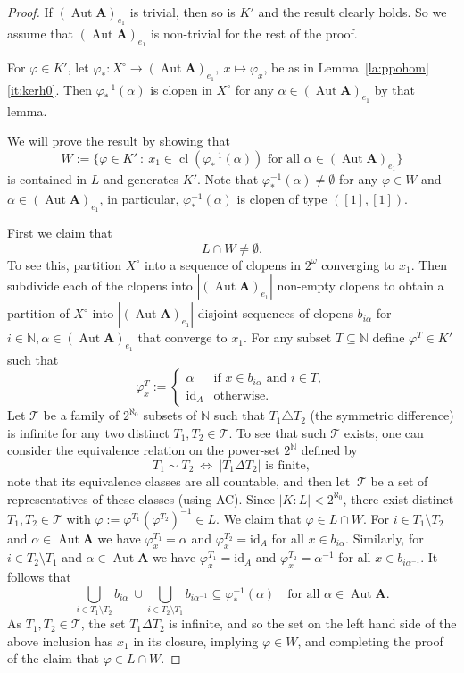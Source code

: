 \documentclass[12pt,a4paper,reqno]{amsart}
\numberwithin{equation}{section}
\theoremstyle{plain}
\theoremstyle{definition}
\newcommand{\A}{\mathbf{A}}
\newcommand{\id}{\mathrm{id}}
\newcommand{\N}{\mathbb{N}}
\DeclareMathOperator{\Aut}{Aut}
\DeclareMathOperator{\cl}{cl}
\newcommand{\st}{\: :\:}
\begin{document}
\begin{proof}
 If $(\Aut\A)_{e_1}$ is trivial, then so is $K'$ and the result clearly holds. So we assume that $(\Aut\A)_{e_1}$
 is non-trivial for the rest of the proof. 
  
 For $\varphi\in K'$, let $\varphi_*\colon X^\circ \to(\Aut\A)_{e_1},\ x \mapsto\varphi_x$, be as in
 Lemma~\ref{la:ppohom}\eqref{it:kerh0}.
 Then $\varphi_*^{-1}(\alpha)$ is clopen in $X^\circ$ for any $\alpha\in(\Aut\A)_{e_1}$ by that
 lemma.

 We will prove the result by showing that
 \[ W := \{\varphi\in K' \st x_1\in\cl( \varphi_*^{-1}(\alpha)) \text{ for all } \alpha\in(\Aut\A)_{e_1} \} \]
 is contained in $L$ and generates $K'$. Note that $\varphi_*^{-1}(\alpha)\neq\emptyset$ for any
 $\varphi\in W$ and $\alpha\in(\Aut\A)_{e_1}$, in particular, $\varphi_*^{-1}(\alpha)$ is clopen of type $([1],[1])$. 
 
 First we claim that
\begin{equation} \label{eq:LcapW}
 L \cap W \neq \emptyset.
\end{equation}   
 To see this, partition $X^\circ$ into a sequence of clopens in $2^\omega$ converging to $x_1$.
 Then subdivide each of the clopens into $|(\Aut\A)_{e_1}|$ non-empty clopens to obtain a partition of
 $X^\circ$ into $|(\Aut\A)_{e_1}|$ disjoint sequences of clopens $b_{i\alpha}$ for $i\in\N,\alpha\in(\Aut\A)_{e_1}$ that converge to $x_1$.
 For any subset $T\subseteq \N$ define $\varphi^T\in K'$ such that
\[
\varphi^T_x := \begin{cases} \alpha & \text{if } x\in b_{i\alpha}\text{ and } i\in T,\\
 \id_A & \text{otherwise}. \end{cases}
\]
Let $\mathcal{T}$ be a family of $2^{\aleph_0}$ subsets of $\N$ such that $T_1\triangle T_2$ (the symmetric difference)
 is infinite for any two distinct $T_1,T_2\in\mathcal{T}$.
 To see that such $\mathcal{T}$ exists, one can consider the equivalence relation on the power-set $2^\N$ defined by
 \[
 T_1\sim T_2\ \Leftrightarrow\ |T_1\Delta T_2|\text{ is finite},
 \]
  note that its equivalence classes are all countable, and then let $\mathcal{~T}$ be a set of representatives of these classes (using AC).
Since $|K:L| < 2^{\aleph_0}$, there exist distinct $T_1,T_2\in\mathcal{T}$ with
 $\varphi:=\varphi^{T_1}(\varphi^{T_2})^{-1}\in L$.  
We claim that $\varphi\in L\cap W$.
  For $i\in T_1\setminus T_2$ and $\alpha\in\Aut \A$ we have
 $\varphi_x^{T_1}=\alpha$  and $\varphi_x^{T_2}=\id_A$ for all $x\in b_{i\alpha}$.
 Similarly, for $i\in T_2\setminus T_1$ and $\alpha\in\Aut \A$ we have
 $\varphi_x^{T_1}=\id_A$  and $\varphi_x^{T_2}=\alpha^{-1}$ for all $x\in b_{i\alpha^{-1}}$.
 It follows that
 \[
 \bigcup_{i\in T_1\setminus T_2} b_{i\alpha}\ \cup \bigcup_{i\in T_2\setminus T_1} b_{i\alpha^{-1}}\subseteq \varphi_*^{-1}(\alpha) \quad \text{for all } \alpha\in\Aut\A.
 \]
 As $T_1,T_2\in\mathcal{T}$, the set $T_1\Delta T_2$ is infinite, and so the set on the left hand side of the above inclusion has $x_1$ in its closure, implying $\varphi \in W$, and completing the proof of the claim that $\varphi\in L\cap W$.


\end{proof}
\end{document}
